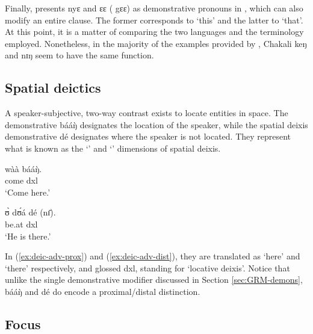 \begin{exe}
\begin{exe}
\begin{exe}
\begin{exe}
\begin{exe}
\begin{exe}
\begin{exe}
\begin{exe}
\begin{exe}
\begin{exe}
\begin{exe}
\begin{exe}
Finally, \citet{mcgi99} presents  {\sls nyɛ} and {\sls ɛɛ} ( {\sls gɛɛ}) as demonstrative pronouns in , which can also modify an entire clause. The former corresponds to `this' and the latter to `that'. At this point, it is a matter of comparing the two languages and the terminology employed.  Nonetheless, in the majority of the examples provided by \citet{mcgi99}, Chakali {\sls keŋ} and {\sls nɪŋ} seem to have the same function. 


\subsection{Spatial deictics}
\label{sec:GRM-deic-adv}
 

A speaker-subjective,  two-way contrast  exists to locate entities in space. The  demonstrative  {\sls bááŋ̀} designates the location of the speaker, while the spatial deixis demonstrative  {\sls dé} designates  where the speaker is not located. They represent what is known as the `' and `' dimensions of spatial deixis.


\ea\label{ex:vp}
\ea\label{ex:deic-adv-prox}
\gll wàà  bááŋ̀.\\
  come {\sc dxl}\\
\glt  `Come here.'

 \ex\label{ex:deic-adv-dist}
\gll ʊ̀ dʊ́á dé (nɪ̄).\\
    {\psg}  be.at  {\sc dxl}  {\postp}\\
\glt  `He is there.'

\z 
 \z

  In (\ref{ex:deic-adv-prox}) and (\ref{ex:deic-adv-dist}),  they are translated as `here' and  `there' respectively, and glossed {\sc dxl}, standing for `locative deixis'.  Notice that unlike the single demonstrative  modifier discussed in Section \ref{sec:GRM-demons},   {\sls bááŋ̀} and   {\sls dé}  do encode a proximal/distal distinction.

\subsection{Focus}
\label{sec:GRM-focus}



\end{exe}
\end{exe}
\end{exe}
\end{exe}
\end{exe}
\end{exe}
\end{exe}
\end{exe}
\end{exe}
\end{exe}
\end{exe}
\end{exe}

